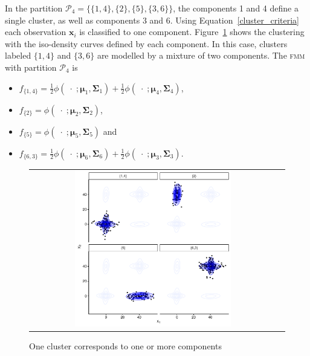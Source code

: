 \documentclass[10pt, a4paper]{article}
\theoremstyle{definition}
\newcommand{\m}[1]{\boldsymbol{#1}}
\newcommand{\fmm}{\textsc{fmm}\xspace}
\begin{document}
\begin{spacing}{1.9}
In the partition $\mathcal{P}_4 = \{ \{1, 4\},\{2\}, \{5\}, \{3, 6\} \}$, the components 1 and 4 define a single cluster, as well as components 3 and 6. Using Equation~\ref{cluster_criteria} each observation $\m x_i$ is classified to one component. Figure~\ref{ex_two_one} shows the clustering with the iso-density curves defined by each component. In this case, clusters labeled $\{1,4\}$ and $\{3, 6\}$ are modelled by a mixture of two components. The \fmm with partition $\mathcal{P}_4$ is
\begin{itemize}
\item $f_{\{1,4\}} = \frac{1}{2} \phi(\;\cdot\; ;  \m\mu_1, \m\Sigma_1) + \frac{1}{2} \phi(\;\cdot\; ;  \m\mu_4, \m\Sigma_4)$, 
\item $f_{\{2\}} = \phi(\;\cdot\; ;  \m\mu_2, \m\Sigma_2)$, 
\item $f_{\{5\}} = \phi(\;\cdot\; ;  \m\mu_5, \m\Sigma_5)$ and
\item $f_{\{6,3\}} = \frac{1}{2} \phi(\;\cdot\; ;  \m\mu_6, \m\Sigma_6) + \frac{1}{2} \phi(\;\cdot\; ;  \m\mu_3, \m\Sigma_3)$.
\end{itemize}

\begin{figure}[h]
\begin{center}
\begin{tabular}{cc}
  \includegraphics[width=0.65\textwidth]{figures/partition-example-part4.pdf} \\
 \end{tabular}
 \caption{One cluster corresponds to one or more components}\label{ex_two_one}
\end{center}
\end{figure}


\end{spacing}
\end{document}
